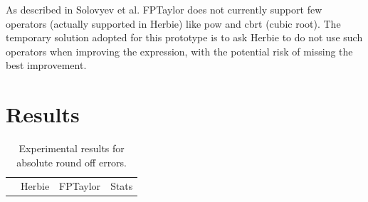 \documentclass[runningheads]{llncs}
\begin{document}
As described in Solovyev et al. FPTaylor does not currently support few operators (actually supported in Herbie) like pow and cbrt (cubic root). The temporary solution adopted for this prototype is to ask Herbie to do not use such operators when improving the expression, with the potential risk of missing the best improvement.

\section{Results}



\begin{table}[h]
	\centering
	\caption{Experimental results for absolute round off errors.}\label{tab1}
	\begin{adjustbox}{center}
	\begin{tabular}{l|c|c|c|c|c|c|c|c|c|}
		&
		\multicolumn{4}{|c|}{Herbie} & \multicolumn{2}{|c|}{FPTaylor}& \multicolumn{3}{|c|}{Stats} \\
		

\end{tabular}
\end{adjustbox}
\end{table}
\end{document}
